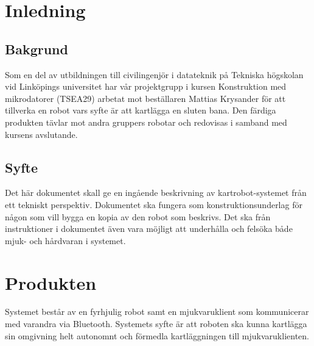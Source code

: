 \documentclass{article}
\begin{document}
\clearpage
\section{Inledning}

\subsection{Bakgrund}
Som en del av utbildningen till civilingenjör i datateknik på Tekniska högskolan vid Linköpings universitet har vår projektgrupp i kursen Konstruktion med mikrodatorer (TSEA29) arbetat mot beställaren Mattias Krysander för att tillverka en robot vars syfte är att kartlägga en sluten bana. Den färdiga produkten tävlar mot andra gruppers robotar och redovisas i samband med kursens avslutande.

\subsection{Syfte}
Det här dokumentet skall ge en ingående beskrivning av kartrobot-systemet från ett tekniskt perspektiv. Dokumentet ska fungera som konstruktionsunderlag för någon som vill bygga en kopia av den robot som beskrivs. Det ska från instruktioner i dokumentet även vara möjligt att underhålla och felsöka både mjuk- och hårdvaran i systemet.

\clearpage
\section{Produkten}

Systemet består av en fyrhjulig robot samt en mjukvaruklient som kommunicerar med varandra via Bluetooth. Systemets syfte är att roboten ska kunna kartlägga sin omgivning helt autonomnt och förmedla kartläggningen till mjukvaruklienten. 
\end{document}
